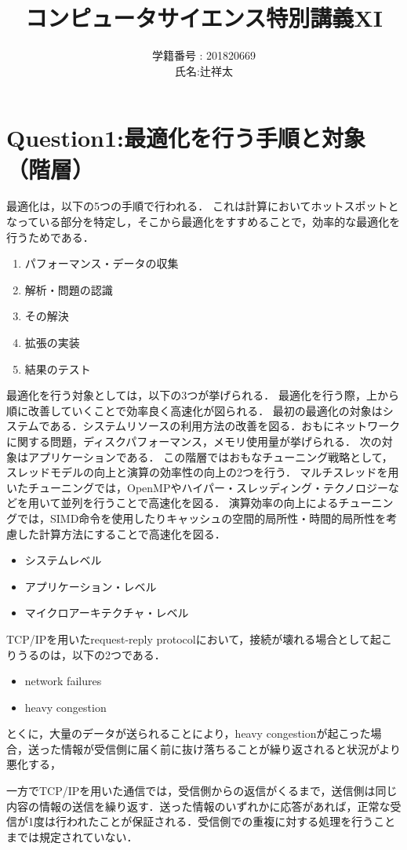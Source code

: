 \documentclass[a4paper,11pt]{jsarticle}
\title{コンピュータサイエンス特別講義XI}
\author{学籍番号 : 201820669\\氏名:辻祥太}
\begin{document}
\maketitle

\newpage
\section{Question1:最適化を行う手順と対象（階層）}
最適化は，以下の5つの手順で行われる．
これは計算においてホットスポットとなっている部分を特定し，そこから最適化をすすめることで，効率的な最適化を行うためである．
\begin{enumerate}
	\item パフォーマンス・データの収集
	\item 解析・問題の認識
	\item その解決
	\item 拡張の実装
	\item 結果のテスト
\end{enumerate}

最適化を行う対象としては，以下の3つが挙げられる．
最適化を行う際，上から順に改善していくことで効率良く高速化が図られる．
最初の最適化の対象はシステムである．システムリソースの利用方法の改善を図る．おもにネットワークに関する問題，ディスクパフォーマンス，メモリ使用量が挙げられる．
次の対象はアプリケーションである．
この階層ではおもなチューニング戦略として，スレッドモデルの向上と演算の効率性の向上の2つを行う．
マルチスレッドを用いたチューニングでは，OpenMPやハイパー・スレッディング・テクノロジーなどを用いて並列を行うことで高速化を図る．
演算効率の向上によるチューニングでは，SIMD命令を使用したりキャッシュの空間的局所性・時間的局所性を考慮した計算方法にすることで高速化を図る．
\begin{itemize}
	\item システムレベル
	\item アプリケーション・レベル
	\item マイクロアーキテクチャ・レベル
\end{itemize}
TCP/IPを用いたrequest-reply protocolにおいて，接続が壊れる場合として起こりうるのは，以下の2つである．
\begin{itemize}
	\item network failures
	\item heavy congestion
\end{itemize}
とくに，大量のデータが送られることにより，heavy congestionが起こった場合，送った情報が受信側に届く前に抜け落ちることが繰り返されると状況がより悪化する，

一方でTCP/IPを用いた通信では，受信側からの返信がくるまで，送信側は同じ内容の情報の送信を繰り返す．送った情報のいずれかに応答があれば，正常な受信が1度は行われたことが保証される．受信側での重複に対する処理を行うことまでは規定されていない．
\end{document}
